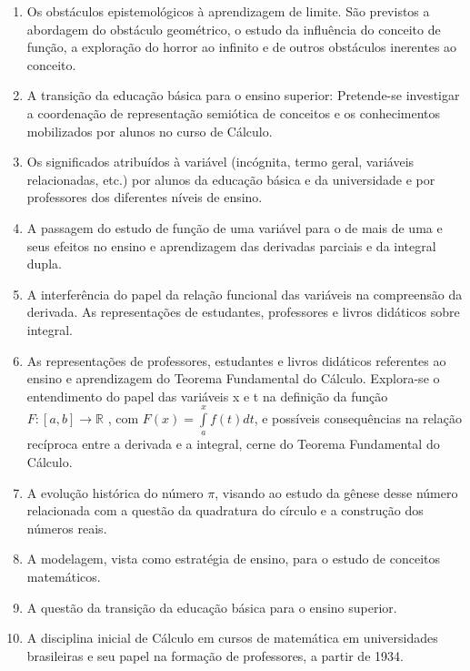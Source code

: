 \documentclass[
	12pt,				%
	openright,			%
	oneside,
	a4paper,			%
	chapter=TITLE,		%
	section=TITLE,		%
	sumario=abnt-6027-2012,
	english,			%
	brazil				%
]{abntex2}
\begin{document}
	\begin{enumerate}
		\item Os obstáculos epistemológicos à aprendizagem de limite. São previstos a abordagem do obstáculo geométrico, o estudo da influência do conceito de função, a exploração do horror ao infinito e de outros obstáculos inerentes ao conceito.
		
		\item A transição da educação básica para o ensino superior: Pretende-se investigar a coordenação de representação semiótica de conceitos e os conhecimentos mobilizados por alunos no curso de Cálculo.
		
		\item Os significados atribuídos à variável (incógnita, termo geral, variáveis relacionadas,
		etc.) por alunos da educação básica e da universidade e por professores dos diferentes
		níveis de ensino.
		
		\item A passagem do estudo de função de uma variável para o de mais de uma e seus efeitos
		no ensino e aprendizagem das derivadas parciais e da integral dupla.
		
		\item A interferência do papel da relação funcional das variáveis na compreensão da derivada.
		As representações de estudantes, professores e livros didáticos sobre integral.
		
		\item As representações de professores, estudantes e livros didáticos referentes ao ensino e
		aprendizagem do Teorema Fundamental do Cálculo. Explora-se o entendimento do
		papel das variáveis x e t na definição da função $\displaystyle F: [a, b] \rightarrow \mathds{R} $ , com $\displaystyle F(x) = \int\limits_a^x { f(t) dt} $, e 	possíveis consequências na relação recíproca entre a derivada e a integral, cerne do Teorema Fundamental do Cálculo.
		
		\item A evolução histórica do número $\pi$, visando ao estudo da gênese desse número relacionada com a questão da quadratura do círculo e a construção dos números reais.

		\item A modelagem, vista como estratégia de ensino, para o estudo de conceitos matemáticos.
		
		\item A questão da transição da educação básica para o ensino superior.
		
		\item A disciplina inicial de Cálculo em cursos de matemática em universidades brasileiras e seu papel na formação de professores, a partir de 1934.
		
	\end{enumerate}
	
\end{document}
